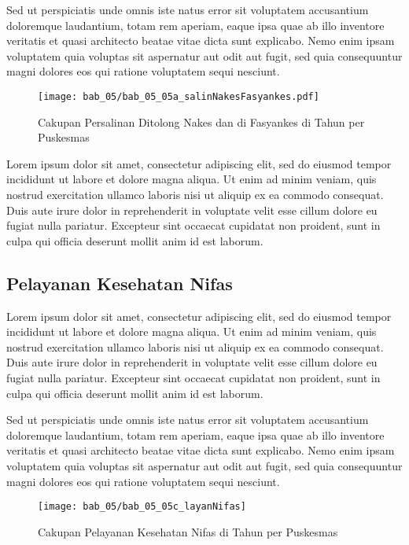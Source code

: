 Sed ut perspiciatis unde omnis iste natus error sit voluptatem accusantium doloremque laudantium, totam rem aperiam, eaque ipsa quae ab illo inventore veritatis et quasi architecto beatae vitae dicta sunt explicabo. Nemo enim ipsam voluptatem quia voluptas sit aspernatur aut odit aut fugit, sed quia consequuntur magni dolores eos qui ratione voluptatem sequi nesciunt.

\begin{figure}[H]
    \centering
    \texttt{[image: bab\_05/bab\_05\_05a\_salinNakesFasyankes.pdf]}
    \caption{Cakupan Persalinan Ditolong Nakes dan di Fasyankes di \namaKabupaten Tahun \tP per Puskesmas}
    \label{fig:Cakupan-Persalinan-Ditolong-Nakes-Fasyankes}
\end{figure}

Lorem ipsum dolor sit amet, consectetur adipiscing elit, sed do eiusmod tempor incididunt ut labore et dolore magna aliqua. Ut enim ad minim veniam, quis nostrud exercitation ullamco laboris nisi ut aliquip ex ea commodo consequat. Duis aute irure dolor in reprehenderit in voluptate velit esse cillum dolore eu fugiat nulla pariatur. Excepteur sint occaecat cupidatat non proident, sunt in culpa qui officia deserunt mollit anim id est laborum.

\subsection{Pelayanan Kesehatan Nifas}
Lorem ipsum dolor sit amet, consectetur adipiscing elit, sed do eiusmod tempor incididunt ut labore et dolore magna aliqua. Ut enim ad minim veniam, quis nostrud exercitation ullamco laboris nisi ut aliquip ex ea commodo consequat. Duis aute irure dolor in reprehenderit in voluptate velit esse cillum dolore eu fugiat nulla pariatur. Excepteur sint occaecat cupidatat non proident, sunt in culpa qui officia deserunt mollit anim id est laborum.

Sed ut perspiciatis unde omnis iste natus error sit voluptatem accusantium doloremque laudantium, totam rem aperiam, eaque ipsa quae ab illo inventore veritatis et quasi architecto beatae vitae dicta sunt explicabo. Nemo enim ipsam voluptatem quia voluptas sit aspernatur aut odit aut fugit, sed quia consequuntur magni dolores eos qui ratione voluptatem sequi nesciunt.

\begin{figure}[H]
    \centering{}
    \texttt{[image: bab\_05/bab\_05\_05c\_layanNifas]}
    \caption{Cakupan Pelayanan Kesehatan Nifas di \namaKabupaten Tahun \tP per Puskesmas}
    \label{fig:Cakupan-Yankes-Nifas}
\end{figure}

